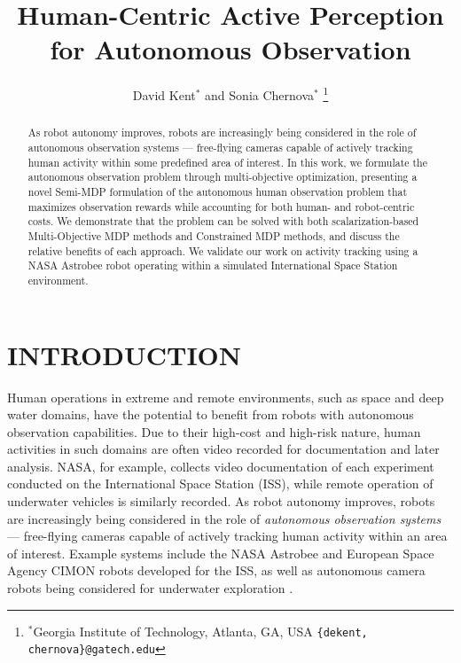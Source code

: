 \documentclass[letterpaper, 10 pt, conference]{ieeeconf}  %
\title{\LARGE \bf
Human-Centric Active Perception for Autonomous Observation
}
\author{David Kent$^{*}$ and Sonia Chernova$^{*}$%
\thanks{$^{*}$Georgia Institute of Technology, Atlanta, GA, USA
        {\tt\small \{dekent, chernova\}@gatech.edu}}%
}
\begin{document}
\maketitle
\thispagestyle{empty}
\pagestyle{empty}


\begin{abstract}


As robot autonomy improves, robots are increasingly being considered in the role of autonomous observation systems — free-flying cameras capable of actively tracking human activity within some predefined area of interest. In this work, we formulate the autonomous observation problem through multi-objective optimization, presenting a novel Semi-MDP formulation of the autonomous human observation problem that maximizes observation rewards while accounting for both human- and robot-centric costs.  We demonstrate that the problem can be solved with both scalarization-based Multi-Objective MDP methods and Constrained MDP methods, and discuss the relative benefits of each approach. We validate our work on activity tracking using a NASA Astrobee robot operating within a simulated International Space Station environment. 

\end{abstract}


\section{INTRODUCTION}

Human operations in extreme and remote environments, such as space and deep water domains, have the potential to benefit from robots with autonomous observation capabilities.  Due to their high-cost and high-risk nature, human activities in such domains are often video recorded for documentation and later analysis.  NASA, for example, collects video documentation of each experiment conducted on the International Space Station (ISS), while remote operation of underwater vehicles is similarly recorded.  As robot autonomy improves, robots are increasingly being considered in the role of \textit{autonomous observation systems} — free-flying cameras capable of actively tracking human activity within an area of interest.  Example systems include the NASA Astrobee \cite{smith2016astrobee} and European Space Agency CIMON \cite{CIMON} robots developed for the ISS, as well as autonomous camera robots being considered for underwater exploration \cite{ishida2012marker}.
 
\end{document}
